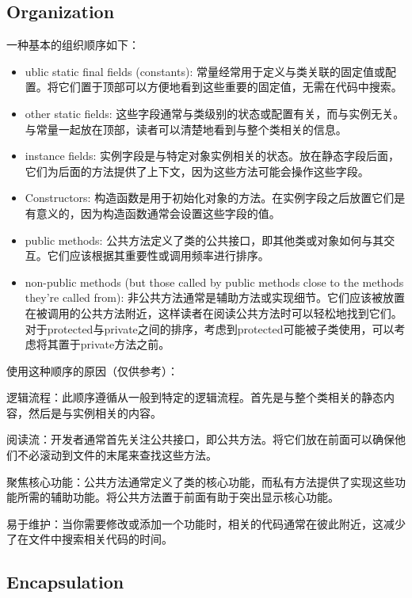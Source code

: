 \documentclass[]{ctexbook}
\begin{document}
\subsection{Organization}
一种基本的组织顺序如下：
\begin{itemize}
    \item ublic static final fields (constants):
          常量经常用于定义与类关联的固定值或配置。将它们置于顶部可以方便地看到这些重要的固定值，无需在代码中搜索。
    \item other static fields:
          这些字段通常与类级别的状态或配置有关，而与实例无关。与常量一起放在顶部，读者可以清楚地看到与整个类相关的信息。

    \item instance fields:
          实例字段是与特定对象实例相关的状态。放在静态字段后面，它们为后面的方法提供了上下文，因为这些方法可能会操作这些字段。

    \item Constructors:
          构造函数是用于初始化对象的方法。在实例字段之后放置它们是有意义的，因为构造函数通常会设置这些字段的值。

    \item public methods:
          公共方法定义了类的公共接口，即其他类或对象如何与其交互。它们应该根据其重要性或调用频率进行排序。

    \item non-public methods (but those called by public methods close to the methods they're called from):
          非公共方法通常是辅助方法或实现细节。它们应该被放置在被调用的公共方法附近，这样读者在阅读公共方法时可以轻松地找到它们。对于protected与private之间的排序，考虑到protected可能被子类使用，可以考虑将其置于private方法之前。
\end{itemize}

使用这种顺序的原因（仅供参考）：

逻辑流程：此顺序遵循从一般到特定的逻辑流程。首先是与整个类相关的静态内容，然后是与实例相关的内容。

阅读流：开发者通常首先关注公共接口，即公共方法。将它们放在前面可以确保他们不必滚动到文件的末尾来查找这些方法。

聚焦核心功能：公共方法通常定义了类的核心功能，而私有方法提供了实现这些功能所需的辅助功能。将公共方法置于前面有助于突出显示核心功能。

易于维护：当你需要修改或添加一个功能时，相关的代码通常在彼此附近，这减少了在文件中搜索相关代码的时间。

\subsection{Encapsulation}
\end{document}
